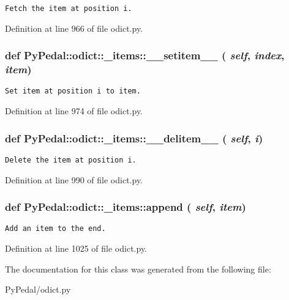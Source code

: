 \footnotesize\begin{verbatim}Fetch the item at position i.\end{verbatim}
\normalsize
 

Definition at line 966 of file odict.py.\hypertarget{classPyPedal_1_1odict_1_1__items_2987b5918090993adde62951347b50c6}{
\subsubsection{\setlength{\rightskip}{0pt plus 5cm}def PyPedal::odict::\_\-items::\_\-\_\-setitem\_\-\_\- ( {\em self}, \/   {\em index}, \/   {\em item})}}
\label{classPyPedal_1_1odict_1_1__items_2987b5918090993adde62951347b50c6}




\footnotesize\begin{verbatim}Set item at position i to item.\end{verbatim}
\normalsize
 

Definition at line 974 of file odict.py.\hypertarget{classPyPedal_1_1odict_1_1__items_a3111dd6a1c593d0f57ecdee72316d3e}{
\subsubsection{\setlength{\rightskip}{0pt plus 5cm}def PyPedal::odict::\_\-items::\_\-\_\-delitem\_\-\_\- ( {\em self}, \/   {\em i})}}
\label{classPyPedal_1_1odict_1_1__items_a3111dd6a1c593d0f57ecdee72316d3e}




\footnotesize\begin{verbatim}Delete the item at position i.\end{verbatim}
\normalsize
 

Definition at line 990 of file odict.py.\hypertarget{classPyPedal_1_1odict_1_1__items_5ba560059305625735efc628474ba326}{
\subsubsection{\setlength{\rightskip}{0pt plus 5cm}def PyPedal::odict::\_\-items::append ( {\em self}, \/   {\em item})}}
\label{classPyPedal_1_1odict_1_1__items_5ba560059305625735efc628474ba326}




\footnotesize\begin{verbatim}Add an item to the end.\end{verbatim}
\normalsize
 

Definition at line 1025 of file odict.py.

The documentation for this class was generated from the following file:\begin{CompactItemize}
\item 
PyPedal/odict.py\end{CompactItemize}
